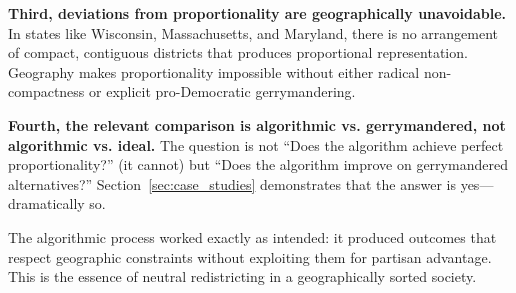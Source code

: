 \textbf{Third, deviations from proportionality are geographically unavoidable.} In states like Wisconsin, Massachusetts, and Maryland, there is no arrangement of compact, contiguous districts that produces proportional representation. Geography makes proportionality impossible without either radical non-compactness or explicit pro-Democratic gerrymandering.

\textbf{Fourth, the relevant comparison is algorithmic vs. gerrymandered, not algorithmic vs. ideal.} The question is not ``Does the algorithm achieve perfect proportionality?'' (it cannot) but ``Does the algorithm improve on gerrymandered alternatives?'' Section~\ref{sec:case_studies} demonstrates that the answer is yes---dramatically so.

The algorithmic process worked exactly as intended: it produced outcomes that respect geographic constraints without exploiting them for partisan advantage. This is the essence of neutral redistricting in a geographically sorted society.

